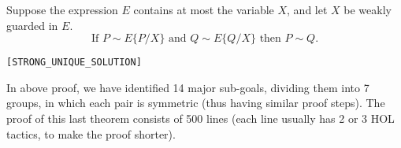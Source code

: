 \begin{theorem}
Suppose the expression $E$ contains at most the variable $X$, and let $X$ be weakly
guarded in $E$.
\begin{equation}
\text{If } P \sim E\{P/X\} \text{ and } Q \sim E\{Q/X\} \text{ then }
P \sim Q.
\end{equation}
\begin{alltt}
\HOLTokenTurnstile{}   \HOLSymConst{\HOLTokenConj{}}  \HOLSymConst{\HOLTokenStrongEQ}   \HOLSymConst{\HOLTokenConj{}}  \HOLSymConst{\HOLTokenStrongEQ}   \HOLSymConst{\HOLTokenImp{}}  \HOLSymConst{\HOLTokenStrongEQ} \hfill{[STRONG_UNIQUE_SOLUTION]}
\end{alltt}
\end{theorem}
In above proof, we have identified 14 major sub-goals, dividing them into 7
groups, in which each pair is symmetric (thus having similar proof
steps). The proof of this last theorem consists of 500 lines (each
line usually has 2 or 3 HOL tactics, to make the proof shorter).

